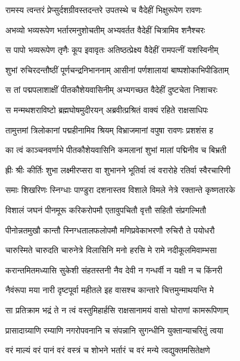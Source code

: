 \twolineshloka
{रामस्य त्वन्तरं प्रेप्सुर्दशग्रीवस्तदन्तरे}
{उपतस्थे च वैदेहीं भिक्षुरूपेण रावणः} %

\twolineshloka
{अभव्यो भव्यरूपेण भर्तारमनुशोचतीम्}
{अभ्यवर्तत वैदेहीं चित्रामिव शनैश्चरः} %

\twolineshloka
{स पापो भव्यरूपेण तृणैः कूप इवावृतः}
{अतिष्ठत्प्रेक्ष्य वैदेहीं रामपत्नीं यशस्विनीम्} %

\twolineshloka
{शुभां रुचिरदन्तौष्ठीं पूर्णचन्द्रनिभाननाम्}
{आसीनां पर्णशालायां बाष्पशोकाभिपीडिताम्} %

\twolineshloka
{स तां पद्मपलाशाक्षीं पीतकौशेयवासिनीम्}
{अभ्यगच्छत वैदेहीं दुष्टचेता निशाचरः} %

\twolineshloka
{स मन्मथशराविष्टो ब्रह्मघोषमुदीरयन्}
{अब्रवीत्प्रश्रितं वाक्यं रहिते राक्षसाधिपः} %

\twolineshloka
{तामुत्तमां त्रिलोकानां पद्महीनामिव श्रियम्}
{विभ्राजमानां वपुषा रावणः प्रशशंस ह} %

\twolineshloka
{का त्वं काञ्चनवर्णाभे पीतकौशेयवासिनि}
{कमलानां शुभां मालां पद्मिनीव च बिभ्रती} %

\twolineshloka
{ह्रीः श्रीः कीर्तिः शुभा लक्ष्मीरप्सरा वा शुभानने}
{भूतिर्वा त्वं वरारोहे रतिर्वा स्वैरचारिणी} %

\twolineshloka
{समाः शिखरिणः स्निग्धाः पाण्डुरा दशनास्तव}
{विशाले विमले नेत्रे रक्तान्ते कृष्णतारके} %

\twolineshloka
{विशालं जघनं पीनमूरू करिकरोपमौ}
{एतावुपचितौ वृत्तौ सहितौ संप्रगल्भितौ} %

\twolineshloka
{पीनोन्नतमुखौ कान्तौ स्निग्धतालफलोपमौ}
{मणिप्रवेकाभरणौ रुचिरौ ते पयोधरौ} %

\twolineshloka
{चारुस्मिते चारुदति चारुनेत्रे विलासिनि}
{मनो हरसि मे रामे नदीकूलमिवाम्भसा} %

\twolineshloka
{करान्तमितमध्यासि सुकेशी संहतस्तनी}
{नैव देवी न गन्धर्वी न यक्षी न च किंनरी} %

\twolineshloka
{नैवंरूपा मया नारी दृष्टपूर्वा महीतले}
{इह वासश्च कान्तारे चित्तमुन्माथयन्ति मे} %

\twolineshloka
{सा प्रतिक्राम भद्रं ते न त्वं वस्तुमिहार्हसि}
{राक्षसानामयं वासो घोराणां कामरूपिणाम्} %

\twolineshloka
{प्रासादाग्र्याणि रम्याणि नगरोपवनानि च}
{संपन्नानि सुगन्धीनि युक्तान्याचरितुं त्वया} %

\twolineshloka
{वरं माल्यं वरं पानं वरं वस्त्रं च शोभने}
{भर्तारं च वरं मन्ये त्वद्युक्तमसितेक्षणे} %

